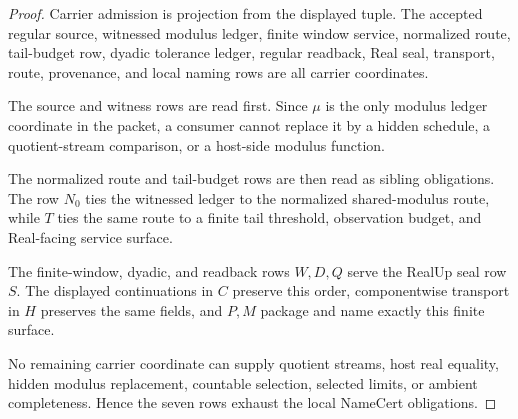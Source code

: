 \begin{proof}
Carrier admission is projection from the displayed tuple. The accepted regular source, witnessed modulus ledger, finite window service, normalized route, tail-budget row, dyadic tolerance ledger, regular readback, Real seal, transport, route, provenance, and local naming rows are all carrier coordinates.

The source and witness rows are read first. Since $\mu$ is the only modulus ledger coordinate in the packet, a consumer cannot replace it by a hidden schedule, a quotient-stream comparison, or a host-side modulus function.

The normalized route and tail-budget rows are then read as sibling obligations. The row $N_0$ ties the witnessed ledger to the normalized shared-modulus route, while $T$ ties the same route to a finite tail threshold, observation budget, and Real-facing service surface.

The finite-window, dyadic, and readback rows $W,D,Q$ serve the RealUp seal row $S$. The displayed continuations in $C$ preserve this order, componentwise transport in $H$ preserves the same fields, and $P,M$ package and name exactly this finite surface.

No remaining carrier coordinate can supply quotient streams, host real equality, hidden modulus replacement, countable selection, selected limits, or ambient completeness. Hence the seven rows exhaust the local NameCert obligations.
\end{proof}

